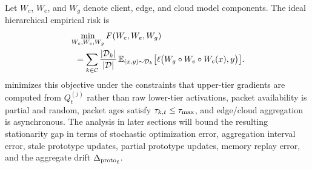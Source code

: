 Let $W_c$, $W_e$, and $W_g$ denote client, edge, and cloud model components. The ideal hierarchical empirical risk is
\begin{equation}
    \begin{split}
    &\min_{W_c,W_e,W_g}
    F(W_c,W_e,W_g)
    \\
    &\;\;=
    \sum_{k\in\mathcal{C}}\frac{|\mathcal{D}_k|}{|\mathcal{D}|}\,
    \mathbb{E}_{(x,y)\sim\mathcal{D}_k}
    \bigl[\ell\bigl(W_g\circ W_e\circ W_c(x),y\bigr)\bigr].
    \end{split}
    \label{eq:global_objective}
\end{equation}
\ehsfp minimizes this objective under the constraints that upper-tier gradients are computed from $Q_t^{(j)}$ rather than raw lower-tier activations, packet availability is partial and random, packet ages satisfy $\tau_{k,t}\leq\tau_{\max}$, and edge/cloud aggregation is asynchronous. The analysis in later sections will bound the resulting stationarity gap in terms of stochastic optimization error, aggregation interval error, stale prototype updates, partial prototype updates, memory replay error, and the aggregate drift ${\Delta_{\mathrm{proto}}}_t$.
